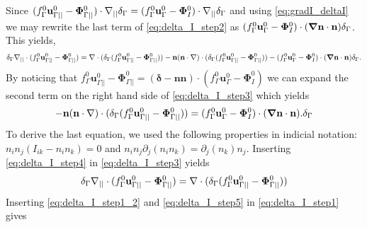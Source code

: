 Since $ (f_\Gamma^0 \textbf{u}_{\Gamma||}^0 - \mathbf{\Phi}_{\Gamma||}^0 )\cdot\mathbf{\nabla}_{||}\delta_\Gamma  = (f_\Gamma^0 \textbf{u}_\Gamma^0 - \mathbf{\Phi}_{I}^0 )\cdot\mathbf{\nabla}_{||}\delta_\Gamma$ and using \ref{eq:gradI_deltaI} we may rewrite the last term of \ref{eq:delta_I_step2} as $(f_\Gamma^0 \textbf{u}_\Gamma^0 - \mathbf{\Phi}_{I}^0 )\cdot(\bm{\mathbf{\nabla}}\textbf{n}\cdot \textbf{n}) \delta_\Gamma$. This yields,
\begin{equation}
    \delta_\Gamma \divI (f_\Gamma^0 \textbf{u}_{\Gamma||}^0
    - \mathbf{\Phi}_{\Gamma||}^0 ) %
    = 
    \div (\delta_\Gamma (f_\Gamma^0 \textbf{u}_{\Gamma||}^0
    - \mathbf{\Phi}_{\Gamma||}^0 ))
    - \textbf{n}(\textbf{n}\cdot\grad)\cdot (\delta_\Gamma (f_\Gamma^0 \textbf{u}_{\Gamma||}^0
    - \mathbf{\Phi}_{\Gamma||}^0 ))
    - (f_\Gamma^0 \textbf{u}_\Gamma^0 - \mathbf{\Phi}_{I}^0 )\cdot(\bm\grad\textbf{n}\cdot \textbf{n}) \delta_\Gamma.
\label{eq:delta_I_step3}
\end{equation}
By noticing that $f_\Gamma^0 \textbf{u}_{\Gamma||}^0
    - \mathbf{\Phi}_{\Gamma||}^0 = (\bm\delta - \textbf{nn})\cdot (f_\Gamma^0 \textbf{u}_\Gamma^0
    - \mathbf{\Phi}_{I}^0 )$ we can expand the second term on the right hand side of \ref{eq:delta_I_step3} which yields
\begin{equation}
    - \textbf{n}(\textbf{n}\cdot\grad)\cdot (\delta_\Gamma (f_\Gamma^0 \textbf{u}_{\Gamma||}^0
    - \mathbf{\Phi}_{\Gamma||}^0 )) = (f_\Gamma^0 \textbf{u}_\Gamma^0 - \mathbf{\Phi}_{I}^0 )\cdot(\bm\grad\textbf{n}\cdot \textbf{n}). \delta_\Gamma%
\label{eq:delta_I_step4}
\end{equation}
To derive the last equation, we used the following properties in indicial notation: $n_in_j(I_{ik}-n_in_k) =0$ and $n_in_j\partial_{j}(n_in_k)=\partial_{j}(n_k)n_j$. Inserting \ref{eq:delta_I_step4} in \ref{eq:delta_I_step3} yields
\begin{equation}
    \delta_\Gamma \divI (f_\Gamma^0 \textbf{u}_{\Gamma||}^0
    - \mathbf{\Phi}_{\Gamma||}^0 ) %
    = 
    \div (\delta_\Gamma (f_\Gamma^0 \textbf{u}_{\Gamma||}^0
    - \mathbf{\Phi}_{\Gamma||}^0 ))
\label{eq:delta_I_step5}
\end{equation}
Inserting \ref{eq:delta_I_step1_2} and \ref{eq:delta_I_step5} in \ref{eq:delta_I_step1} gives

